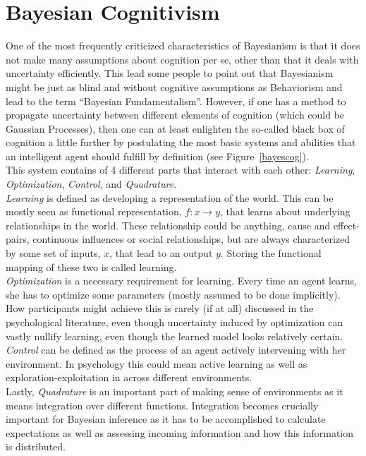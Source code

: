 \documentclass[oneside, 11pt]{book}
\begin{document}
\section{Bayesian Cognitivism}
One of the most frequently criticized characteristics of Bayesianism is that it does not make many assumptions about cognition per se, other than that it deals with uncertainty efficiently. This lead some people to point out that Bayesianism might be just as blind and without cognitive assumptions as Behaviorism and lead to the term ``Bayesian Fundamentalism''. However, if one has a method to propagate uncertainty between different elements of cognition (which could be Gaussian Processes), then one can at least enlighten the so-called black box of cognition a little further by postulating the most basic systems and abilities that an intelligent agent should fulfill by definition (see Figure~\ref{bayescog}).\\
This system contains of 4 different parts that interact with each other: \emph{Learning}, \emph{Optimization}, \emph{Control}, and \emph{Quadrature}.\\
\emph{Learning} is defined as developing a representation of the world. This can be mostly seen as functional representation, $f:x \rightarrow y$, that learns about underlying relationships in the world. These relationship could be anything, cause and effect-pairs, continuous influences or social relationships, but are always characterized by some set of inputs, $x$, that lead to an output $y$. Storing the functional mapping of these two is called learning.\\
\emph{Optimization} is a necessary requirement for learning. Every time an agent learns, she has to optimize some parameters (mostly assumed to be done implicitly). How participants might achieve this is rarely (if at all) discussed in the psychological literature, even though uncertainty induced by optimization can vastly nullify learning, even though the learned model looks relatively certain.\\
\emph{Control} can be defined as the process of an agent actively intervening with her environment. In psychology this could mean active learning as well as exploration-exploitation in across different environments.\\
Lastly, \emph{Quadrature} is an important part of making sense of environments as it means integration over different functions. Integration becomes crucially important for Bayesian inference as it has to be accomplished to calculate expectations as well as assessing incoming information and how this information is distributed.
\end{document}
